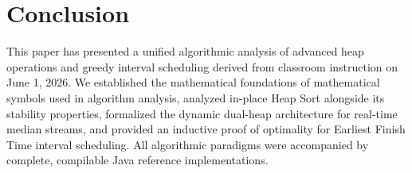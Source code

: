 \documentclass[10pt,journal,compsoc,onecolumn]{IEEEtran}
\begin{document}
\section{Conclusion}
\label{sec:conclusion}

This paper has presented a unified algorithmic analysis of advanced heap operations and greedy interval scheduling derived from classroom instruction on June 1, 2026. We established the mathematical foundations of mathematical symbols used in algorithm analysis, analyzed in-place Heap Sort alongside its stability properties, formalized the dynamic dual-heap architecture for real-time median streams, and provided an inductive proof of optimality for Earliest Finish Time interval scheduling. All algorithmic paradigms were accompanied by complete, compilable Java reference implementations.
\end{document}
